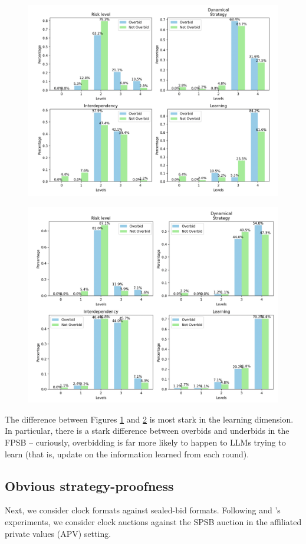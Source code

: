 \documentclass{article} %
\begin{document}
\begin{figure}[h!]
    \centering \includegraphics[width=0.8\linewidth]{Figs/FP_semantic.png}
    \caption{}
    \label{fig:FP_sem}
\end{figure}

\begin{figure}[h!]
    \centering \includegraphics[width=0.8\linewidth]{Figs/SP_semantic.png}
    \caption{}
    \label{fig:SP_sem}
\end{figure}

The difference between Figures \ref{fig:FP_sem} and \ref{fig:SP_sem} is most stark in the learning dimension. 
In particular, there is a stark difference between overbids and underbids in the FPSB -- curiously, overbidding is far more likely to happen to LLMs trying to learn (that is, update on the information learned from each round).

\subsection{Obvious strategy-proofness}\label{session:OSP}
Next, we consider clock formats against sealed-bid formats. Following \cite{li2017obviously} and \cite{breitmoser2022obviousness}'s experiments, we consider clock auctions against the SPSB auction in the affiliated private values (APV) setting. 
\end{document}
